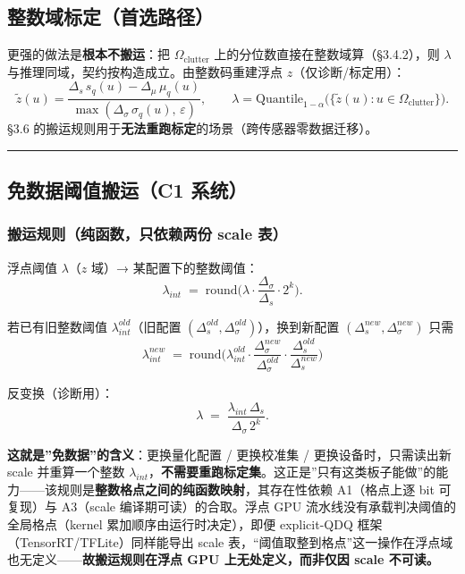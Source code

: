 \subsection{整数域标定（首选路径）}\label{ux6574ux6570ux57dfux6807ux5b9aux9996ux9009ux8defux5f84}

更强的做法是\textbf{根本不搬运}：把 \(\Omega_{\mathrm{clutter}}\)
上的分位数直接在整数域算（§3.4.2），则 \(\lambda\)
与推理同域，契约按构造成立。由整数码重建浮点 \(z\)（仅诊断/标定用）： \[
\tilde z(u)=\frac{\Delta_s\,s_q(u)-\Delta_\mu\,\mu_q(u)}{\max(\Delta_\sigma\,\sigma_q(u),\,\varepsilon)},
\qquad
\lambda=\mathrm{Quantile}_{1-\alpha}\big(\{\tilde z(u):u\in\Omega_{\mathrm{clutter}}\}\big).
\tag{3.24}
\] §3.6
的搬运规则用于\textbf{无法重跑标定}的场景（跨传感器零数据迁移）。

\begin{center}\rule{0.5\linewidth}{0.5pt}\end{center}

\subsection{免数据阈值搬运（C1
系统）}\label{ux514dux6570ux636eux9608ux503cux642cux8fd0c1-ux7cfbux7edf}

\subsubsection{搬运规则（纯函数，只依赖两份 scale
表）}\label{ux642cux8fd0ux89c4ux5219ux7eafux51fdux6570ux53eaux4f9dux8d56ux4e24ux4efd-scale-ux8868}

浮点阈值 \(\lambda\)（\(z\) 域）→ 某配置下的整数阈值： \[
\lambda_{int} \;=\; \mathrm{round}\!\Big(\lambda\cdot\frac{\Delta_\sigma}{\Delta_s}\cdot 2^{k}\Big).
\tag{3.25}
\]

若已有旧整数阈值 \(\lambda_{int}^{old}\)（旧配置
\((\Delta_s^{old},\Delta_\sigma^{old})\)），换到新配置
\((\Delta_s^{new},\Delta_\sigma^{new})\) 只需 \[
\boxed{\;
\lambda_{int}^{new} \;=\; \mathrm{round}\!\Big(
\lambda_{int}^{old}\cdot
\frac{\Delta_\sigma^{new}}{\Delta_\sigma^{old}}\cdot
\frac{\Delta_s^{old}}{\Delta_s^{new}}\Big)\;}
\tag{3.26}
\]

反变换（诊断用）： \[
\lambda \;=\; \frac{\lambda_{int}\,\Delta_s}{\Delta_\sigma\,2^{k}} .
\tag{3.27}
\]

\textbf{这就是''免数据''的含义}：更换量化配置 / 更换校准集 /
更换设备时，只需读出新 scale 并重算一个整数
\(\lambda_{int}\)，\textbf{不需要重跑标定集}。这正是''只有这类板子能做''的能力------该规则是\textbf{整数格点之间的纯函数映射}，其存在性依赖
A1（格点上逐 bit 可复现）与 A3（scale 编译期可读）的合取。浮点 GPU
流水线没有承载判决阈值的全局格点（kernel 累加顺序由运行时决定），即便
explicit-QDQ 框架（TensorRT/TFLite）同样能导出 scale
表，``阈值取整到格点''这一操作在浮点域也无定义------\textbf{故搬运规则在浮点
GPU 上无处定义，而非仅因 scale 不可读。}


